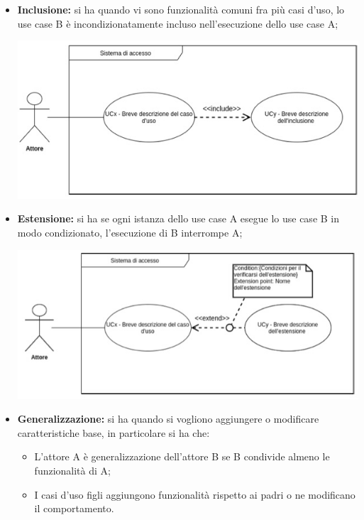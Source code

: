 \begin{itemize}
	\item \textbf{Inclusione:} si ha quando vi sono funzionalità comuni fra più casi d'uso, lo use case B è incondizionatamente incluso nell'esecuzione dello use case A;
	\begin{center}
		\centering
		\includegraphics[scale=0.4]{Immagini/UML/Inclusione}
	\end{center}
	\item \textbf{Estensione:} si ha se ogni istanza dello use case A esegue lo use case B in modo condizionato, l'esecuzione di B interrompe A;
	\begin{center}
		\centering
		\includegraphics[scale=0.4]{Immagini/UML/Estensione}
	\end{center}
	\item \textbf{Generalizzazione:} si ha quando si vogliono aggiungere o modificare caratteristiche base, in particolare si ha che:
	\begin{itemize}
		\item L'attore A è generalizzazione dell'attore B se B condivide almeno le funzionalità di A;
		\item I casi d'uso figli aggiungono funzionalità rispetto ai padri o ne modificano il comportamento.
	\end{itemize}

\end{itemize}
